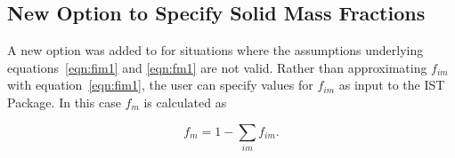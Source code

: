 \subsection{New Option to Specify Solid Mass Fractions} \label{sec:solidmassfrac2}

A new option was added to \mf for situations where the assumptions underlying equations~\ref{eqn:fim1} and \ref{eqn:fm1} are not valid.  Rather than approximating $f_{im}$ with equation~\ref{eqn:fim1}, the user can specify values for $f_{im}$ as input to the IST Package.  In this case $f_m$ is calculated as

\begin{equation}
\label{eqn:fm1}
f_m = 1 - \sum_{im}f_{im}.
\end{equation}
